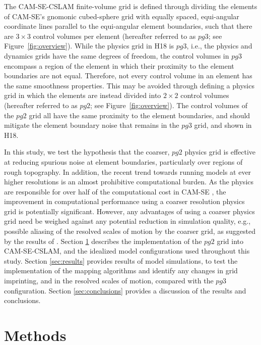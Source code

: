 \documentclass{agujournal}
\begin{document}
The CAM-SE-CSLAM finite-volume grid is defined through dividing the elements of CAM-SE's gnomonic cubed-sphere grid with equally spaced, equi-angular coordinate lines parallel to the equi-angular element boundaries, such that there are $3\times 3$ control volumes per element (hereafter referred to as $pg3$; see Figure~\ref{fig:overview}). While the physics grid in H18 is $pg3$, i.e., the physics and dynamics grids have the same degrees of freedom, the control volumes in $pg3$ encompass a region of the element in which their proximity to the element boundaries are not equal. Therefore, not every control volume in an element has the same smoothness properties. This may be avoided through defining a physics grid in which the elements are instead divided into $2\times 2$ control volumes (hereafter referred to as $pg2$; see Figure~\ref{fig:overview}). The control volumes of the $pg2$ grid all have the same proximity to the element boundaries, and should mitigate the element boundary noise that remains in the $pg3$ grid, and shown in H18.

In this study, we test the hypothesis that the coarser, $pg2$ physics grid is effective at reducing spurious noise at element boundaries, particularly over regions of rough topography. In addition, the recent trend towards running models at ever higher resolutions is an almost prohibitive computational burden. As the physics are responsible for over half of the computational cost in CAM-SE \citep{LetAl2018JAMES}, the improvement in computational performance using a coarser resolution physics grid is potentially significant. However, any advantages of using a coarser physics grid need be weighed against any potential reduction in simulation quality, e.g., possible aliasing of the resolved scales of motion by the coarser grid, as suggested by the results of \cite{W1999T}. Section \ref{sec:methods} describes the implementation of the $pg2$ grid into CAM-SE-CSLAM, and the idealized model configurations used throughout this study. Section \ref{sec:results} provides results of model simulations, to test the implementation of the mapping algorithms and identify any changes in grid imprinting, and in the resolved scales of motion, compared with the $pg3$ configuration. Section \ref{sec:conclusions} provides a discussion of the results and conclusions.

\section{Methods}\label{sec:methods}
\end{document}
